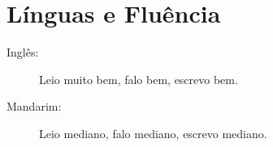 \documentclass[letterpaper]{twentysecondcv} %
\makeatletter
\def\py@yunpriv#1{%
  \if a#1 10\else
  \if o#1 9\else
  \if e#1 8\else
  \if i#1 7\else
  \if u#1 6\else
  \if v#1 5\else
  \if A#1 4\else
  \if O#1 3\else
  \if E#1 2\fi\fi\fi\fi\fi\fi\fi\fi\fi0
}
\def\py@init{%
  \edef\py@befirst{}%
  \edef\py@char{}\edef\py@tuneletter{}%
  \def\py@last{}%
  \def\py@tune{5}%
}
\def\pinyin#1{%
  \edef\py@postscan{#1}%
  \py@init
  \loop
  \edef\py@char{\expandafter\@car\py@postscan\@nil}%
  \edef\py@postscan{\expandafter\@cdr\py@postscan\@nil}%
  \ifnum 0 < 0\py@char
    \edef\py@tune{\py@char}%
    \py@first \py@tuneat\py@tuneletter\py@tune \py@last\kern -4sp\kern 4sp{}\py@init
  \else
    \ifnum\py@yunpriv\py@char > \py@yunpriv\py@tuneletter
      \edef\py@tuneletter{\py@char}\edef\py@first{\py@befirst}\def\py@last{}%
    \else
      \edef\py@last{\py@last\if v\py@char\"u\else\py@char\fi}%
    \fi
    \edef\py@befirst{\py@befirst\if v\py@char\"u\else\py@char\fi}%
  \fi
  \ifx\py@postscan\@empty\else
  \repeat
}
\let\py@macron \=
\let\py@acute \'
\let\py@hacek \v
\let\py@grave \`
\def\py@tuneat#1#2{%
  \if v#1%
    \py@tune@v #2%
  \else
  \if i#1%
    \py@tune@i #2%
  \else
    \ifcase#2%
      \or\py@macron #1\or\py@acute #1\or\py@hacek #1\or\py@grave #1\else #1%
    \fi
  \fi\fi
}
\def\py@tune@v#1{{%
    \dimen@ii 1ex%
    \fontdimen5\font 1.1ex%
    \rlap{\"u}%
    \fontdimen5\font .6ex%
    \ifcase#1%
      \or\py@macron u\or\py@acute u\or\py@hacek u\or\py@grave u\else u%
    \fi
    \fontdimen5\font\dimen@ii
  }}
\def\py@tune@i#1{%
  \ifcase#1
    \or\py@macron \i\or\py@acute \i\or\py@hacek \i\or\py@grave \i\else i%
  \fi
}
\makeatother
\begin{document}
\vspace{0.2cm}
\section{Línguas e Fluência}

\begin{description}
\item[Inglês:]Leio muito bem, falo bem, escrevo bem.
\item[Mandarim:] Leio mediano, falo mediano, escrevo mediano.
\end{description}

\vspace{0.2cm}





\end{document}
